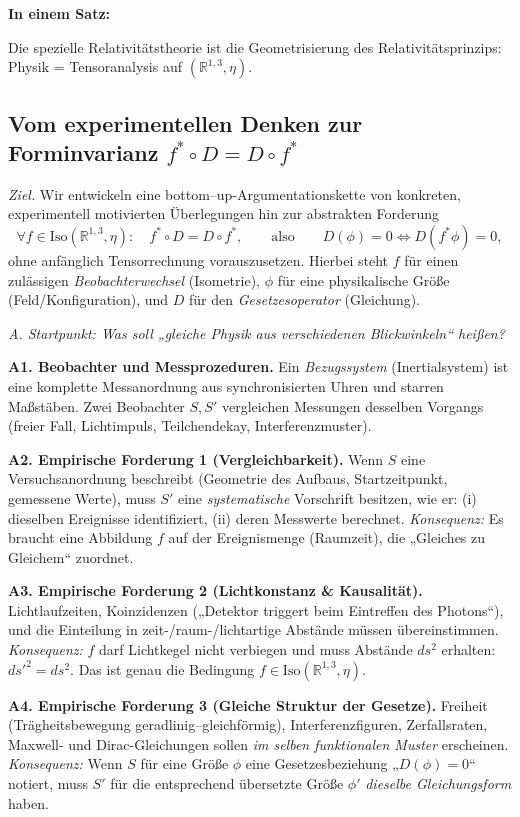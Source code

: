 \documentclass[10pt, letterpaper]{article}
\newcommand{\R}{\mathbb{R}}
\begin{document}
\bigskip
\textbf{In einem Satz:}

Die spezielle Relativitätstheorie ist die Geometrisierung des Relativitätsprinzips: Physik = Tensoranalysis auf $(\R^{1,3},\eta)$.

\pagebreak

\subsection{Vom experimentellen Denken zur Forminvarianz $f^*\circ D = D\circ f^*$}

\emph{Ziel.} 
Wir entwickeln eine bottom–up-Argumentationskette von konkreten, experimentell motivierten
Überlegungen hin zur abstrakten Forderung
\[
\forall f\in\mathrm{Iso}(\R^{1,3},\eta):\quad
f^*\circ D = D\circ f^*,\qquad
\text{also}\qquad D(\phi)=0 \iff D(f^*\phi)=0,
\]
ohne anfänglich Tensorrechnung vorauszusetzen. Hierbei steht $f$ für einen zulässigen
\emph{Beobachterwechsel} (Isometrie), $\phi$ für eine physikalische Größe (Feld/Konfiguration),
und $D$ für den \emph{Gesetzesoperator} (Gleichung).

\bigskip
\emph{A. Startpunkt: Was soll „gleiche Physik aus verschiedenen Blickwinkeln“ heißen?}

\textbf{A1. Beobachter und Messprozeduren.}
Ein \emph{Bezugssystem} (Inertialsystem) ist eine komplette Messanordnung aus synchronisierten Uhren
und starren Maßstäben. Zwei Beobachter $S,S'$ vergleichen Messungen desselben Vorgangs
(freier Fall, Lichtimpuls, Teilchendekay, Interferenzmuster).

\textbf{A2. Empirische Forderung 1 (Vergleichbarkeit).}
Wenn $S$ eine Versuchsanordnung beschreibt (Geometrie des Aufbaus, Startzeitpunkt, gemessene Werte),
muss $S'$ eine \emph{systematische} Vorschrift besitzen, wie er: 
(i) dieselben Ereignisse identifiziert, 
(ii) deren Messwerte berechnet.
\emph{Konsequenz:} Es braucht eine Abbildung $f$ auf der Ereignismenge (Raumzeit), die „Gleiches zu Gleichem“ zuordnet.

\textbf{A3. Empirische Forderung 2 (Lichtkonstanz \& Kausalität).}
Lichtlaufzeiten, Koinzidenzen („Detektor triggert beim Eintreffen des Photons“),
und die Einteilung in zeit-/raum-/lichtartige Abstände müssen übereinstimmen.
\emph{Konsequenz:} $f$ darf Lichtkegel nicht verbiegen und muss Abstände $ds^2$ erhalten:
$ds'^2 = ds^2$. Das ist genau die Bedingung $f\in \mathrm{Iso}(\R^{1,3},\eta)$.

\textbf{A4. Empirische Forderung 3 (Gleiche Struktur der Gesetze).}
Freiheit (Trägheitsbewegung geradlinig–gleichförmig), Interferenzfiguren, Zerfallsraten, 
Maxwell- und Dirac-Gleichungen sollen \emph{im selben funktionalen Muster} erscheinen.
\emph{Konsequenz:} Wenn $S$ für eine Größe $\phi$ eine Gesetzesbeziehung „$D(\phi)=0$“ notiert,
muss $S'$ für die entsprechend übersetzte Größe $\phi'$ \emph{dieselbe Gleichungsform} haben.
\end{document}
